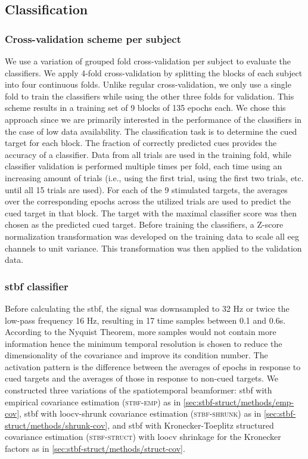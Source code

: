 	\subsection{Classification}
	\subsubsection{Cross-validation scheme per subject}
	We use a variation of grouped fold cross-validation per subject to evaluate the classifiers.
	We apply 4-fold cross-validation by splitting the blocks of each subject into
	four continuous folds.
	Unlike regular cross-validation, we only use a single fold to train the
	classifiers while using the other three folds for validation.
	This scheme results in a training set of 9 blocks of 135 epochs each.
	We chose this approach since we are primarily interested in the performance of the classifiers in the case of low data availability.
	The classification task is to determine the cued target for each block.
	The fraction of correctly predicted cues provides the accuracy of a classifier.
	Data from all trials are used in the training fold, while classifier validation
	is performed multiple times per fold, each time using an increasing amount of
	trials (i.e., using the first trial, using the first two trials, etc. until all 15 trials
	are used).
	For each of the 9 stimulated targets, the averages over the corresponding epochs across
	the utilized trials are used to predict the cued target in that block.
	The target with the maximal classifier score was then chosen as the predicted
	cued target.
	Before training the classifiers, a Z-score normalization transformation was
	developed on the training data to scale all \ac{eeg} channels to unit variance.
	This transformation was then applied to the validation data.

  \subsubsection{\Acl{stbf} classifier}
	Before calculating the \ac{stbf}, the signal was downsampled to
	32 Hz or twice the low-pass frequency 16 Hz, resulting in 17 time samples
	between 0.1 and 0.6s. According to the Nyquist Theorem, more samples would not
	contain more information hence the minimum temporal resolution is chosen to reduce
	the dimensionality of the covariance and improve its condition number.
	The activation pattern is the difference between the averages of epochs in response to cued targets and the averages of those in response to non-cued targets.
	We constructed three variations of the spatiotemporal beamformer:
	\ac{stbf} with empirical covariance estimation (\textsc{stbf-emp}) as in
	\cref{sec:stbf-struct/methods/emp-cov}, \ac{stbf} with
	\ac{loocv}-shrunk covariance estimation (\textsc{stbf-shrunk}) as in
	\cref{sec:stbf-struct/methods/shrunk-cov}, and \ac{stbf} with
	Kronecker-Toeplitz structured covariance estimation (\textsc{stbf-struct}) with \ac{loocv} shrinkage for
	the Kronecker factors as in \cref{sec:stbf-struct/methods/struct-cov}.

